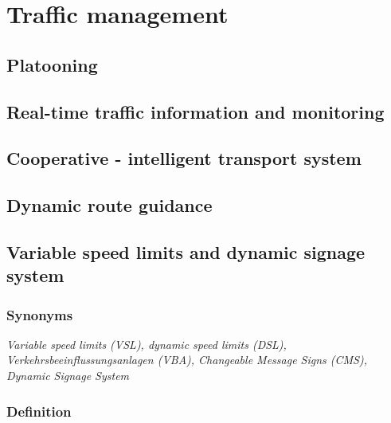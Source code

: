 \documentclass[
]{book}
\begin{document}
\hypertarget{traffic}{%
\chapter{Traffic management}\label{traffic}}

\hypertarget{platooning}{%
\section{Platooning}\label{platooning}}

\hypertarget{real-time-traffic-information-and-monitoring}{%
\section{Real-time traffic information and monitoring}\label{real-time-traffic-information-and-monitoring}}

\hypertarget{cooperative---intelligent-transport-system}{%
\section{Cooperative - intelligent transport system}\label{cooperative---intelligent-transport-system}}

\hypertarget{dynamic-route-guidance}{%
\section{Dynamic route guidance}\label{dynamic-route-guidance}}

\hypertarget{variable-speed-limits-and-dynamic-signage-system}{%
\section{Variable speed limits and dynamic signage system}\label{variable-speed-limits-and-dynamic-signage-system}}

\hypertarget{synonyms-3}{%
\subsection*{Synonyms}\label{synonyms-3}}

\emph{Variable speed limits (VSL), dynamic speed limits (DSL), Verkehrsbeeinflussungsanlagen (VBA), Changeable Message Signs (CMS), Dynamic Signage System}

\hypertarget{definition-3}{%
\subsection*{Definition}\label{definition-3}}
\end{document}
